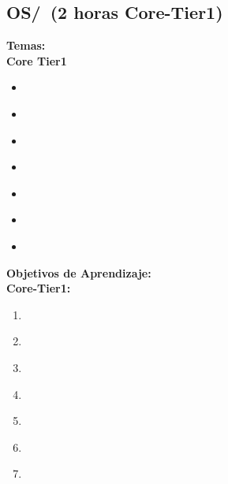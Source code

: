 \subsection{OS/\OSOperatingSystemPrinciples~(2 horas Core-Tier1)}\label{sec:BOK:OSOperatingSystemPrinciples}
\noindent \textbf{Temas:}\\
\noindent \textbf{Core Tier1}
\begin{itemize}
	\item \OSOperatingSystemPrinciplesTopicStructuring\label{sec:BOK:OSOperatingSystemPrinciplesTopicStructuring}
	\item \OSOperatingSystemPrinciplesTopicAbstractions\label{sec:BOK:OSOperatingSystemPrinciplesTopicAbstractions}
	\item \OSOperatingSystemPrinciplesTopicConcepts\label{sec:BOK:OSOperatingSystemPrinciplesTopicConcepts}
	\item \OSOperatingSystemPrinciplesTopicThe\label{sec:BOK:OSOperatingSystemPrinciplesTopicThe}
	\item \OSOperatingSystemPrinciplesTopicDevice\label{sec:BOK:OSOperatingSystemPrinciplesTopicDevice}
	\item \OSOperatingSystemPrinciplesTopicInterrupts\label{sec:BOK:OSOperatingSystemPrinciplesTopicInterrupts}
	\item \OSOperatingSystemPrinciplesTopicConcept\label{sec:BOK:OSOperatingSystemPrinciplesTopicConcept}
\end{itemize}


\noindent \textbf{Objetivos de Aprendizaje:}\\
\noindent \textbf{Core-Tier1:}
\begin{enumerate}
	\setcounter{enumi}{0}
	\item \OSOperatingSystemPrinciplesLOExplainTheA\xspace[\OSOperatingSystemPrinciplesLOExplainTheALevel]\label{sec:BOK:OSOperatingSystemPrinciplesLOExplainTheA}
	\item \OSOperatingSystemPrinciplesLOExplainTheBuilding\xspace[\OSOperatingSystemPrinciplesLOExplainTheBuildingLevel]\label{sec:BOK:OSOperatingSystemPrinciplesLOExplainTheBuilding}
	\item \OSOperatingSystemPrinciplesLODescribeTheApis\xspace[\OSOperatingSystemPrinciplesLODescribeTheApisLevel]\label{sec:BOK:OSOperatingSystemPrinciplesLODescribeTheApis}
	\item \OSOperatingSystemPrinciplesLODescribeHowAreApplication\xspace[\OSOperatingSystemPrinciplesLODescribeHowAreApplicationLevel]\label{sec:BOK:OSOperatingSystemPrinciplesLODescribeHowAreApplication}
	\item \OSOperatingSystemPrinciplesLOContrastKernel\xspace[\OSOperatingSystemPrinciplesLOContrastKernelLevel]\label{sec:BOK:OSOperatingSystemPrinciplesLOContrastKernel}
	\item \OSOperatingSystemPrinciplesLODiscussTheDisadvantagesInterrupt\xspace[\OSOperatingSystemPrinciplesLODiscussTheDisadvantagesInterruptLevel]\label{sec:BOK:OSOperatingSystemPrinciplesLODiscussTheDisadvantagesInterrupt}
	\item \OSOperatingSystemPrinciplesLOExplainTheAAnd\xspace[\OSOperatingSystemPrinciplesLOExplainTheAAndLevel]\label{sec:BOK:OSOperatingSystemPrinciplesLOExplainTheAAnd}
\end{enumerate}


